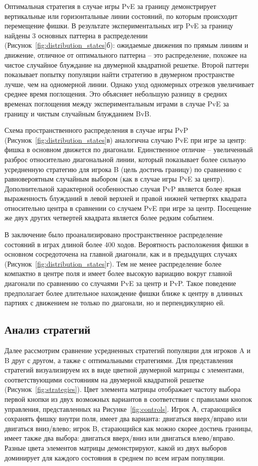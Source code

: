 Оптимальная стратегия в случае игры PvE за границу демонстрирует вертикальные или горизонтальные линии состояний, по которым происходит перемещение фишки. В результате экспериментальных игр PvE за границу найдены 3 основных паттерна в распределении (Рисунок~\cref{fig:distribution_states}б): ожидаемые движения по прямым линиям и движение, отличное от оптимального паттерна -- это распределение, похожее на чистое случайное блуждание на двумерной квадратной решетке. Второй паттерн показывает попытку популяции найти стратегию в двумерном пространстве лучше, чем на одномерной линии. Однако уход одномерных отрезков увеличивает среднее время поглощения. Это объясняет небольшую разницу в средних временах поглощения между экспериментальным играми в случае PvE за границу и чистым случайным блужданием BvB.

Схема пространственного распределения в случае игры PvP (Рисунок~\cref{fig:distribution_states}в) аналогична случаю PvE при игре за центр: фишка в основном движется по диагонали. Единственное отличие -- увеличенный разброс относительно диагональной линии, который показывает более сильную усредненную стратегию для игрока B (цель достичь границу) по сравнению с равновероятным случайным выбором (как в случае игры PvE за центр). Дополнительной характерной особенностью случая PvP является более яркая выраженность блужданий в левой верхней и правой нижней четвертях квадрата относительно центра в сравнении со случаем PvE при игре за центр. Посещение же двух других четвертей квадрата является более редким событием.

В заключение было проанализировано пространственное распределение состояний в играх длиной более $400$ ходов. Вероятность расположения фишки в основном сосредоточена на главной диагонали, как и в предыдущих случаях (Рисунок~\cref{fig:distribution_states}г). Тем не менее распределение более компактно в центре поля и имеет более высокую вариацию вокруг главной диагонали по сравнению со случаями PvE за центр и PvP. Такое поведение предполагает более длительное нахождение фишки ближе к центру в длинных партиях с движением не только по диагонали, но и перпендикулярно ей.

\subsection{Анализ стратегий}\label{subsec:ch3/sec4/sub5}

Далее рассмотрим сравнение усредненных стратегий популяции для игроков A и B друг с другом, а также с оптимальными стратегиями. Для представления стратегий визуализируем их в виде цветной двумерной матрицы с элементами, соответствующими состояниям на двумерной квадратной решетке (Рисунок~\cref{fig:strategies}). Цвет элемента матрицы отображает частоту выбора первой кнопки из двух возможных вариантов в соответствии с правилами кнопок управления, представленных на Рисунке~\cref{fig:controls}. Игрок А, старающийся сохранять фишку внутри поля, имеет два варианта: двигаться вверх/вправо или двигаться вниз/влево; игрок B, старающийся как можно скорее достичь границы, имеет также два выбора: двигаться вверх/вниз или двигаться влево/вправо. Разные цвета элементов матрицы демонстрируют, какой из двух выборов доминирует для каждого состояния в среднем по всем играм популяции.

